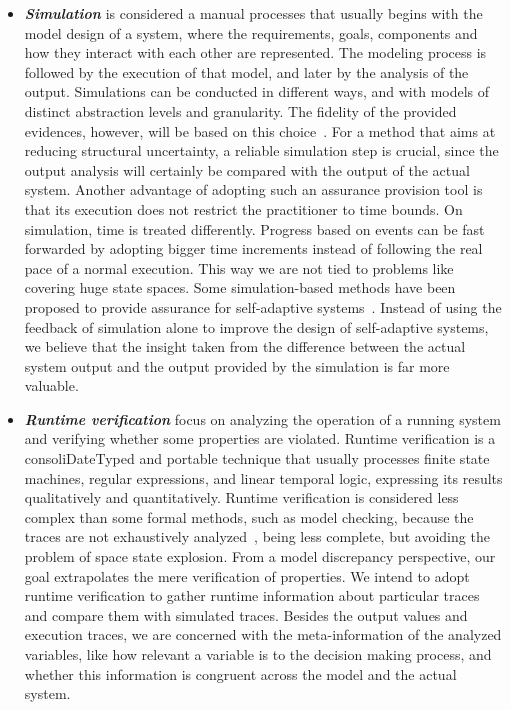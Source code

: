 \begin{itemize}
	\item \textit{\textbf{Simulation}} is considered a manual processes that usually begins with the model design of a system, where the requirements, goals, components and how they interact with each other are represented. The modeling process is followed by the execution of that model, and later by the analysis of the output. Simulations can be conducted in different ways, and with models of distinct abstraction levels and granularity. The fidelity of the provided evidences, however, will be based on this choice~\cite{Weyns2016PerpetualAF}. For a method that aims at reducing structural uncertainty, a reliable simulation step is crucial, since the output analysis will certainly be compared with the output of the actual system. Another advantage of adopting such an assurance provision tool is that its execution does not restrict the practitioner to time bounds. On simulation, time is treated differently. Progress based on events can be fast forwarded by adopting bigger time increments instead of following the real pace of a normal execution. This way we are not tied to problems like covering huge state spaces. Some simulation-based methods have been proposed to provide assurance for self-adaptive systems~\cite{camara2016analyzing,weyns2016model,rodrigues2019enhancing}. Instead of using the feedback of simulation alone to improve the design of self-adaptive systems, we believe that the insight taken from the difference between the actual system output and the output provided by the simulation is far more valuable. 
	
	\item \textit{\textbf{Runtime verification}} focus on analyzing the operation of a running system and verifying whether some properties are violated. Runtime verification is a consoliDateTyped and portable technique that usually processes finite state machines, regular expressions, and linear temporal logic, expressing its results qualitatively and quantitatively. Runtime verification is considered less complex than some formal methods, such as model checking, because the traces are not exhaustively analyzed~\cite{Weyns2016PerpetualAF}, being less complete, but avoiding the problem of space state explosion. From a model discrepancy perspective, our goal extrapolates the mere verification of properties. We intend to adopt runtime verification to gather runtime information about particular traces and compare them with simulated traces. Besides the output values and execution traces, we are concerned with the meta-information of the analyzed variables, like how relevant a variable is to the decision making process, and whether this information is congruent across the model and the actual system.
	
\end{itemize}

